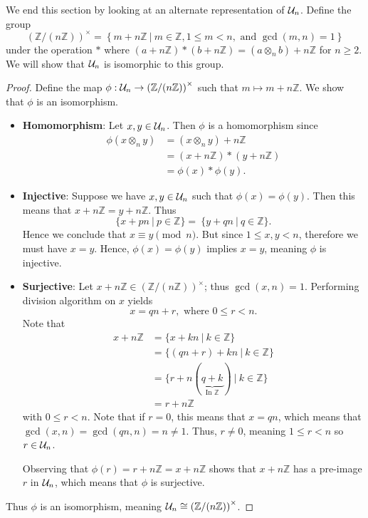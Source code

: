 We end this section by looking at an alternate representation of $\mathcal{U}_{n}$. Define the group
\[
    \left(\mathbb{Z}/(n\mathbb{Z})\right)^{\times} = \left\{m + n\mathbb{Z} \ \vert \ m \in \mathbb{Z}, 1 \leq m < n, \text{ and } \gcd(m, n)=1\right\}
\]
under the operation $\ast$ where $(a+n\mathbb{Z})\ast(b+n\mathbb{Z}) = (a\otimes_n b) + n\mathbb{Z}$ for $n \geq 2$. We will show that $\mathcal{U}_{n}$ is isomorphic to this group.
\begin{proof}
    Define the map $\phi: \mathcal{U}_{n} \to \left(\mathbb{Z}/(n\mathbb{Z})\right)^{\times}$ such that $m \mapsto m + n\mathbb{Z}$. We show that $\phi$ is an isomorphism.

    \begin{itemize}
        \item \textbf{Homomorphism}: Let $x, y \in \mathcal{U}_{n}$. Then $\phi$ is a homomorphism since
        \begin{align*}
            \phi(x \otimes_n y) &= (x \otimes_n y) + n\mathbb{Z}\\
            &= (x + n\mathbb{Z}) \ast (y + n\mathbb{Z})\\
            &= \phi(x) \ast \phi(y).
        \end{align*}

        \item \textbf{Injective}: Suppose we have $x, y \in \mathcal{U}_{n}$ such that $\phi(x) = \phi(y)$. Then this means that $x + n\mathbb{Z} = y + n\mathbb{Z}$. Thus
        \[
            \{x + pn \ | \ p \in \mathbb{Z} \} = \ \{y + qn \ | \ q \in \mathbb{Z} \}.
        \]
        Hence we conclude that $x \equiv y \pmod{n}$. But since $1 \leq x, y < n$, therefore we must have $x = y$. Hence, $\phi(x) = \phi(y)$ implies $x = y$, meaning $\phi$ is injective.

        \item \textbf{Surjective}: Let $x + n\mathbb{Z} \in \left(\mathbb{Z}/(n\mathbb{Z})\right)^{\times}$; thus $\gcd(x, n) = 1$. Performing division algorithm on $x$ yields
        \[
            x = qn + r, \text{ where } 0 \leq r < n.
        \]
        Note that
        \begin{align*}
            x + n\mathbb{Z} &= \{x + kn \ | \ k \in \mathbb{Z}\}\\
            &= \{(qn + r) + kn \ | \ k \in \mathbb{Z}\}\\
            &= \{r + n(\underbrace{q+k}_{\text{In } \mathbb{Z}}) \ | \ k \in \mathbb{Z}\}\\
            &= r + n\mathbb{Z}
        \end{align*}
        with $0 \leq r < n$. Note that if $r = 0$, this means that $x = qn$, which means that $\gcd(x, n) = \gcd(qn, n) = n \neq 1$. Thus, $r \neq 0$, meaning $1 \leq r < n$ so $r \in \mathcal{U}_{n}$.

        Observing that $\phi(r) = r + n\mathbb{Z} = x + n\mathbb{Z}$ shows that $x + n\mathbb{Z}$ has a pre-image $r$ in $\mathcal{U}_{n}$, which means that $\phi$ is surjective.
    \end{itemize}

    Thus $\phi$ is an isomorphism, meaning $\mathcal{U}_{n} \cong \left(\mathbb{Z}/(n\mathbb{Z})\right)^{\times}$.
\end{proof}

